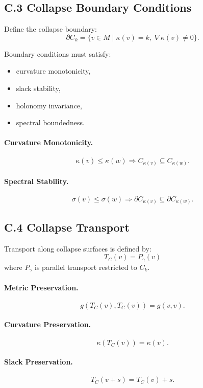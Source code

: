 \subsection{C.3 Collapse Boundary Conditions}

Define the collapse boundary:
\[
\partial C_k = \{ v \in M \mid \kappa(v) = k, \; \nabla \kappa(v) \neq 0 \}.
\]

Boundary conditions must satisfy:

\begin{itemize}
    \item curvature monotonicity,
    \item slack stability,
    \item holonomy invariance,
    \item spectral boundedness.
\end{itemize}

\paragraph{Curvature Monotonicity.}
\[
\kappa(v) \le \kappa(w) \Rightarrow C_{\kappa(v)} \subseteq C_{\kappa(w)}.
\]

\paragraph{Spectral Stability.}
\[
\sigma(v) \le \sigma(w) \Rightarrow \partial C_{\kappa(v)} \subseteq \partial C_{\kappa(w)}.
\]

\subsection{C.4 Collapse Transport}

Transport along collapse surfaces is defined by:
\[
T_C(v) = P_\gamma(v)
\]
where $P_\gamma$ is parallel transport restricted to $C_k$.

\paragraph{Metric Preservation.}
\[
g(T_C(v), T_C(v)) = g(v,v).
\]

\paragraph{Curvature Preservation.}
\[
\kappa(T_C(v)) = \kappa(v).
\]

\paragraph{Slack Preservation.}
\[
T_C(v + s) = T_C(v) + s.
\]

